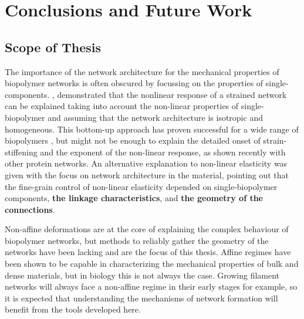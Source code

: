 \chapter{Conclusions and Future Work}
\label{Chapter-Conclusions}

\section{Scope of Thesis}%
\label{sec:scope_of_thesis}

The importance of the network architecture for the mechanical properties of biopolymer networks is often obscured by focussing on the properties of single-components. \cite{storm_nonlinear_2005}, demonstrated that the nonlinear response of a strained network can be explained taking into account the non-linear properties of single-biopolymer and assuming that the network architecture is isotropic and homogeneous. This bottom-up approach has proven successful for a wide range of biopolymers \cite{carrillo_nonlinear_2013}, but might not be enough to explain the detailed onset of strain-stiffening and the exponent of the non-linear response, as shown recently with other protein networks\cite{licup_stress_2015}. An alternative explanation to non-linear elasticity was given with the focus on network architecture in the material\cite{onck_alternative_2005}, pointing out that the fine-grain control of non-linear elasticity depended on single-biopolymer components, \textbf{the linkage characteristics}, and \textbf{the geometry of the connections}.


Non-affine deformations are at the core of explaining the complex behaviour of biopolymer networks, but methods to reliably gather the geometry of the networks have been lacking and are the focus of this thesis. Affine regimes have been shown to be capable in characterizing the mechanical properties of bulk and dense materials, but in biology this is not always the case. Growing filament networks will always face a non-affine regime in their early stages for example, so it is expected that understanding the mechanisms of network formation will benefit from the tools developed here.

